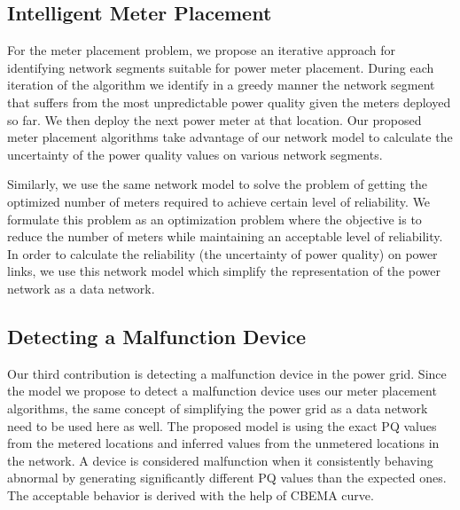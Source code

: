 \subsection{Intelligent Meter Placement}
For the meter placement problem, we propose an iterative approach for identifying network segments suitable for power meter placement. During each iteration of the algorithm we identify in a greedy manner the network segment that suffers from the most unpredictable power quality given the meters deployed so far. We then deploy the next power meter at that location. Our proposed meter placement algorithms take advantage of our network model to calculate the uncertainty of the power quality values on various network segments.

Similarly, we use the same network model to solve the problem of getting the optimized number of meters required to achieve certain level of reliability. We formulate this problem as an optimization problem where the objective is to reduce the number of meters while maintaining an acceptable level of reliability. In order to calculate the reliability (the uncertainty of power quality) on power links, we use this network model which simplify the representation of the power network as a data network.


\subsection{Detecting a Malfunction Device}
Our third contribution is detecting a malfunction device in the power grid. Since the model we propose to detect a malfunction device uses our meter placement algorithms, the same concept of simplifying the power grid as a data network need to be used here as well. The proposed model is using the exact PQ values from the metered locations and inferred values from the unmetered locations in the network. A device is considered malfunction when it consistently behaving abnormal by generating significantly different PQ values than the expected ones. The acceptable behavior is derived with the help of CBEMA curve.